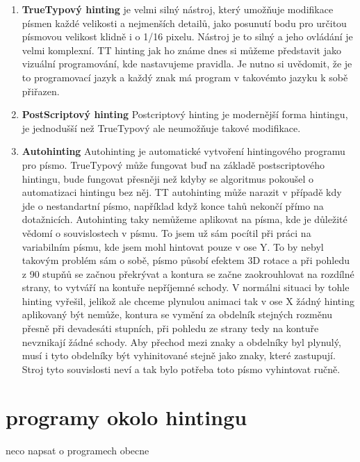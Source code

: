 \documentclass{article}
\begin{document}
\begin{enumerate}
\item \textbf{TrueTypový hinting}
je velmi silný nástroj, který umožňuje modifikace písmen každé velikosti a nejmenších detailů, jako posunutí bodu pro určitou písmovou velikost klidně i o 1/16 pixelu. Nástroj je to silný a jeho ovládání je velmi komplexní. TT hinting jak ho známe dnes si můžeme představit jako vizuální programování, kde nastavujeme pravidla. Je nutno si uvědomit, že je to programovací jazyk a každý znak má program v takovémto jazyku k sobě přiřazen.

\item \textbf{PostScriptový hinting}
Postcriptový hinting je modernější forma hintingu, je jednodušší než TrueTypový ale neumožňuje takové modifikace.

\item \textbf{Autohinting}
Autohinting je automatické vytvoření hintingového programu pro písmo. TrueTypový může fungovat buď na základě postscriptového hintingu, bude fungovat přesněji než kdyby se algoritmus pokoušel o automatizaci hintingu bez něj. TT autohinting může narazit v případě kdy jde o nestandartní písmo, například když konce tahů nekončí přímo na dotažnicích. Autohinting taky nemůžeme aplikovat na písma, kde je důležité vědomí o souvislostech v písmu. To jsem už sám pocítil při práci na variabilním písmu, kde jsem mohl hintovat pouze v ose Y. To by nebyl takovým problém sám o sobě, písmo působí efektem 3D rotace a při pohledu z 90 stupňů se začnou překrývat a kontura se začne zaokrouhlovat na rozdílné strany, to vytváří na kontuře nepříjemné schody. V normálni situaci by tohle hinting vyřešil, jelikož ale chceme plynulou animaci tak v ose X žádný hinting aplikovaný být nemůže, kontura se vymění za obdelník stejných rozměnu přesně při devadesáti stupních, při pohledu ze strany tedy na kontuře nevznikají žádné schody. Aby přechod mezi znaky a obdelníky byl plynulý, musí i tyto obdelníky být vyhinitované stejně jako znaky, které zastupují. Stroj tyto souvislosti neví a tak bylo potřeba toto písmo vyhintovat ručně.
\end{enumerate}

\section{programy okolo hintingu}
neco napsat o programech obecne
\end{document}
